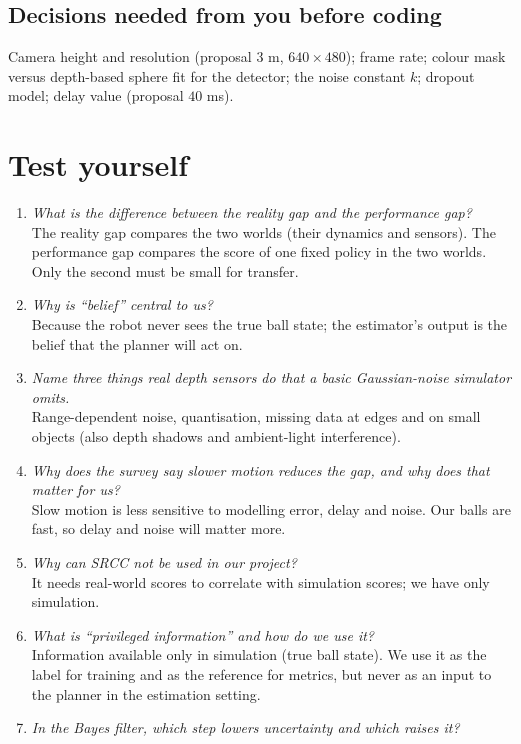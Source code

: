 \documentclass[11pt,a4paper]{article}
\begin{document}
\subsection{Decisions needed from you before coding}
Camera height and resolution (proposal $3$ m, $640\times480$); frame rate; colour mask versus
depth-based sphere fit for the detector; the noise constant $k$; dropout model; delay value
(proposal $40$ ms).


\section{Test yourself}
\begin{enumerate}[label=\textbf{Q\arabic*.}]
\item \emph{What is the difference between the reality gap and the performance gap?}\\
The reality gap compares the two worlds (their dynamics and sensors). The performance gap compares
the score of one fixed policy in the two worlds. Only the second must be small for transfer.
\item \emph{Why is ``belief'' central to us?}\\
Because the robot never sees the true ball state; the estimator's output is the belief that the
planner will act on.
\item \emph{Name three things real depth sensors do that a basic Gaussian-noise simulator omits.}\\
Range-dependent noise, quantisation, missing data at edges and on small objects (also depth shadows
and ambient-light interference).
\item \emph{Why does the survey say slower motion reduces the gap, and why does that matter for us?}\\
Slow motion is less sensitive to modelling error, delay and noise. Our balls are fast, so delay and
noise will matter more.
\item \emph{Why can SRCC not be used in our project?}\\
It needs real-world scores to correlate with simulation scores; we have only simulation.
\item \emph{What is ``privileged information'' and how do we use it?}\\
Information available only in simulation (true ball state). We use it as the label for training
and as the reference for metrics, but never as an input to the planner in the estimation setting.
\item \emph{In the Bayes filter, which step lowers uncertainty and which raises it?}\\

\end{enumerate}
\end{document}
